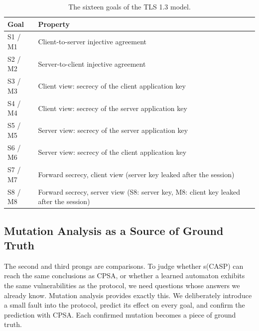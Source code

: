 \documentclass[11pt]{article}
\begin{document}
\begin{table}[h!]
\centering
\small
\begin{tabular}{|l|l|}
\hline
\textbf{Goal} & \textbf{Property} \\
\hline
S1 / M1 & Client-to-server injective agreement \\
S2 / M2 & Server-to-client injective agreement \\
S3 / M3 & Client view: secrecy of the client application key \\
S4 / M4 & Client view: secrecy of the server application key \\
S5 / M5 & Server view: secrecy of the server application key \\
S6 / M6 & Server view: secrecy of the client application key \\
S7 / M7 & Forward secrecy, client view (server key leaked after the session) \\
S8 / M8 & Forward secrecy, server view (S8: server key, M8: client key leaked after the session) \\
\hline
\end{tabular}
\caption{The sixteen goals of the TLS 1.3 model.}
\label{tab:goals}
\end{table}

\subsection{Mutation Analysis as a Source of Ground Truth}
\label{subsec:mutation}
The second and third prongs are comparisons. To judge whether s(CASP) can reach the same conclusions as CPSA, or whether a learned automaton exhibits the same vulnerabilities as the protocol, we need questions whose answers we already know. Mutation analysis provides exactly this. We deliberately introduce a small fault into the protocol, predict its effect on every goal, and confirm the prediction with CPSA. Each confirmed mutation becomes a piece of ground truth.
\end{document}
